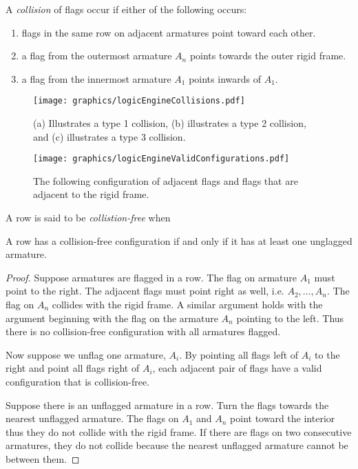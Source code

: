 A \textit{collision} of flags occur if either of the following occurs:
\begin{enumerate}
\item flags in the same row on adjacent armatures point toward each other.
\item a flag from the outermost armature $A_n$ points towards the outer rigid frame.
\item a flag from the innermost armature $A_1$ points inwards of $A_1$.
\end{enumerate}
\begin{figure}[!htbp]
\begin{center}
\texttt{[image: graphics/logicEngineCollisions.pdf]}
\caption{(a) Illustrates a type 1 collision, (b) illustrates a type 2 collision, and (c) 
illustrates a type 3 collision.}\label{fig:logicEngineCollisions.pdf}
\end{center}

\end{figure}
\begin{figure}[!htbp]
\begin{center}
\texttt{[image: graphics/logicEngineValidConfigurations.pdf]}
\caption{The following configuration of adjacent flags 
and flags that are adjacent to the rigid frame.}\label{fig:logicEngineValidConfigurations.pdf}
\end{center}
\end{figure}
A row is said to be \textit{collistion-free} when 
\begin{lem}\label{lem:logicEngine1}A row has a collision-free configuration if and only if it has 
at least one unglagged armature. \end{lem}
\begin{proof}

Suppose armatures are flagged in a row.  The flag on armature $A_1$ must point to the 
right.  The adjacent flags must point right as well, i.e. $A_2, ..., A_n$.  The flag on $A_n$ 
collides with the rigid frame.  A similar argument holds with the argument beginning with the flag 
on the armature $A_n$ pointing to the left.  Thus there is no collision-free configuration with all 
armatures flagged.

Now suppose we unflag one armature, $A_i$.  By pointing all flags left of $A_i$ to the right and  
point all flags right of $A_i$, each adjacent pair of flags have a valid configuration that is 
collision-free.

Suppose there is an unflagged armature in a row.  Turn the flags towards the nearest unflagged 
armature.  The flags on $A_1$ and $A_n$ point toward the interior thus they do not collide with the 
rigid frame.  If there are flags on two consecutive armatures, they do not collide because the 
nearest unflagged armature cannot be between them.
\end{proof}

